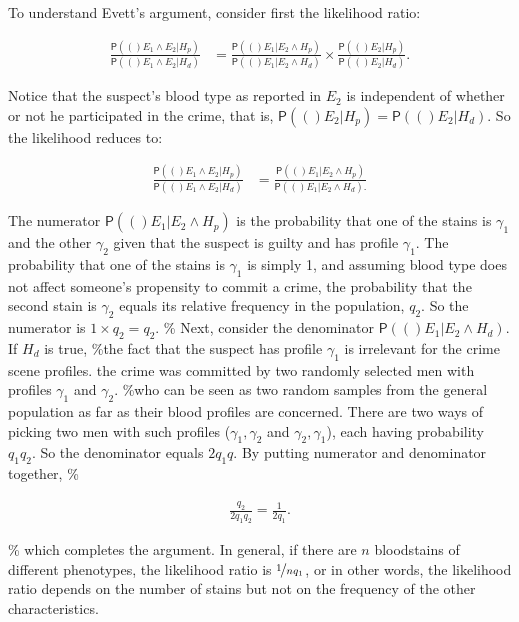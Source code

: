 \documentclass[10pt,dvipsnames,enabledeprecatedfontcommands]{scrartcl}
\newcommand{\pr}[1]{\mathsf{P}(#1)}
\begin{document}
To understand Evett's argument, consider first the likelihood ratio:

\begin{align*}
\frac{\pr(E_1\wedge E_2\vert H_p)}{
    \pr(E_1\wedge E_2\vert H_d)} & = \frac{\pr(E_1 \vert E_2 \wedge H_p)}{
    \pr(E_1 \vert E_2 \wedge H_d)
    }\times 
 \frac{\pr(E_2\vert H_p)}{\pr(E_2 \vert H_d)}. 
 \end{align*}

\noindent Notice that the suspect's blood type as reported in \(E_2\) is
independent of whether or not he participated in the crime, that is,
\(\pr(E_2\vert H_p)=\pr(E_2 \vert H_d)\). So the likelihood reduces to:

\begin{align*}
 \frac{\pr(E_1\wedge E_2\vert H_p)}{
    \pr(E_1\wedge E_2\vert H_d)} & = \frac{\pr(E_1 \vert E_2 \wedge H_p)}{
    \pr(E_1 \vert E_2 \wedge H_d).
 } \end{align*}

\noindent
 The numerator \(\pr(E_1 \vert E_2 \wedge H_p)\) is the probability that
one of the stains is \(\gamma_1\) and the other \(\gamma_2\) given that
the suspect is guilty and has profile \(\gamma_1\). The probability that
one of the stains is \(\gamma_1\) is simply 1, and assuming blood type
does not affect someone's propensity to commit a crime, the probability
that the second stain is \(\gamma_2\) equals its relative frequency in
the population, \(q_2\). So the numerator is \(1\times q_2 = q_2\). \%
Next, consider the denominator \(\pr(E_1 \vert E_2 \wedge H_d)\). If
\(H_d\) is true, \%the fact that the suspect has profile \(\gamma_1\) is
irrelevant for the crime scene profiles. the crime was committed by two
randomly selected men with profiles \(\gamma_1\) and \(\gamma_2\). \%who
can be seen as two random samples from the general population as far as
their blood profiles are concerned. There are two ways of picking two
men with such profiles (\(\gamma_1,\gamma_2\) and
\(\gamma_2,\gamma_1\)), each having probability \(q_1q_2\). So the
denominator equals \(2q_1q\). By putting numerator and denominator
together, \%

\begin{align*}
 \frac{q_2}{2q_1q_2} = \frac{1}{2q_1}. 
 \end{align*}

\% \noindent which completes the argument. In general, if there are
\(n\) bloodstains of different phenotypes, the likelihood ratio is
\(\nicefrac{1}{nq_1}\), or in other words, the likelihood ratio depends
on the number of stains but not on the frequency of the other
characteristics.
\end{document}
